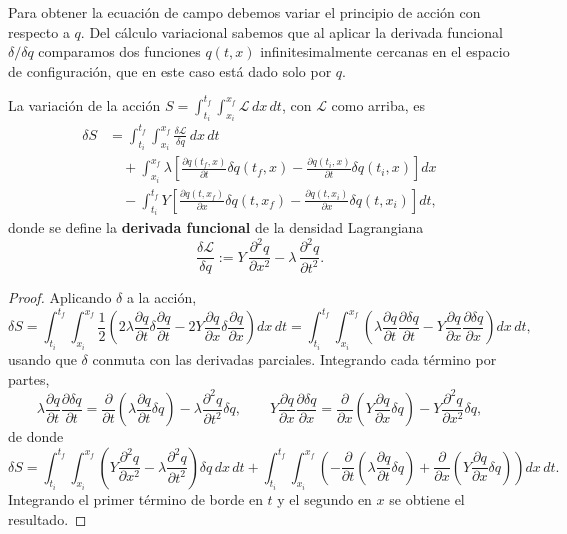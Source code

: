 Para obtener la ecuación de campo debemos variar el principio de acción
con respecto a $q$. Del cálculo variacional sabemos que al aplicar la
derivada funcional $\delta/\delta q$ comparamos dos funciones $q(t,x)$
infinitesimalmente cercanas en el espacio de configuración, que en este
caso está dado solo por $q$.

\begin{proposicionc}
La variación de la acción $S=\int_{t_i}^{t_f}\int_{x_i}^{x_f}
\mathscr{L}\,dx\,dt$, con $\mathscr{L}$ como arriba, es
\begin{align*}
\delta S &= \int_{t_i}^{t_f}\int_{x_i}^{x_f} \frac{\delta
\mathscr{L}}{\delta q}\, dx\,dt \\
&\quad + \int_{x_i}^{x_f} \lambda\left[
\frac{\partial q(t_f,x)}{\partial t}\delta q(t_f,x) - \frac{\partial
q(t_i,x)}{\partial t}\delta q(t_i,x)\right] dx \\
&\quad - \int_{t_i}^{t_f} Y
\left[\frac{\partial q(t,x_f)}{\partial x}\delta q(t,x_f) -
\frac{\partial q(t,x_i)}{\partial x}\delta q(t,x_i)\right] dt,
\end{align*}
donde se define la \textbf{derivada funcional} de la densidad
Lagrangiana
\[
\frac{\delta\mathscr{L}}{\delta q} := Y\, \frac{\partial^2 q}{\partial
x^2} - \lambda\, \frac{\partial^2 q}{\partial t^2} .
\]
\end{proposicionc}

\begin{proof}
Aplicando $\delta$ a la acción,
\[
\delta S = \int_{t_i}^{t_f}\int_{x_i}^{x_f} \frac12\left(2\lambda
\frac{\partial q}{\partial t}\delta\frac{\partial q}{\partial t} -
2Y\frac{\partial q}{\partial x}\delta\frac{\partial q}{\partial
x}\right) dx\,dt = \int_{t_i}^{t_f}\int_{x_i}^{x_f}\left(\lambda
\frac{\partial q}{\partial t}\frac{\partial\delta q}{\partial t} -
Y\frac{\partial q}{\partial x}\frac{\partial\delta q}{\partial
x}\right) dx\,dt,
\]
usando que $\delta$ conmuta con las derivadas parciales. Integrando cada
término por partes,
\[
\lambda\frac{\partial q}{\partial t}\frac{\partial\delta q}{\partial t}
= \frac{\partial}{\partial t}\left(\lambda\frac{\partial q}{\partial
t}\delta q\right) - \lambda\frac{\partial^2 q}{\partial t^2}\delta q,
\qquad Y\frac{\partial q}{\partial x}\frac{\partial\delta q}{\partial x}
= \frac{\partial}{\partial x}\left(Y\frac{\partial q}{\partial
x}\delta q\right) - Y\frac{\partial^2 q}{\partial x^2}\delta q,
\]
de donde
\[
\delta S = \int_{t_i}^{t_f}\int_{x_i}^{x_f} \left(Y\frac{\partial^2
q}{\partial x^2} - \lambda\frac{\partial^2 q}{\partial t^2}\right)
\delta q\,dx\,dt + \int_{t_i}^{t_f}\int_{x_i}^{x_f}\left(-\frac{\partial}
{\partial t}\left(\lambda\frac{\partial q}{\partial t}\delta q\right) +
\frac{\partial}{\partial x}\left(Y\frac{\partial q}{\partial x}\delta
q\right)\right) dx\,dt .
\]
Integrando el primer término de borde en $t$ y el segundo en $x$ se
obtiene el resultado. \qedhere
\end{proof}

